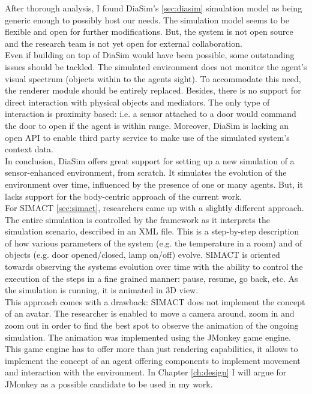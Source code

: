 After thorough analysis, I found DiaSim's \ref{sec:diasim} simulation model as being generic enough to possibly host our needs. The simulation model seems to be flexible and open for further modifications. But, the system is not open source and the research team is not yet open for external collaboration.\\

Even if building on top of DiaSim would have been possible, some outstanding issues should be tackled. The simulated environment does not monitor the agent's visual spectrum (objects within to the agents sight). To accommodate this need, the renderer module should be entirely replaced. Besides, there is no support for direct interaction with physical objects and mediators. The only type of interaction is proximity based: i.e. a sensor attached to a door would command the door to open if the agent is within range. Moreover, DiaSim is lacking an open API to enable third party service to make use of the simulated system's context data.\\

In conclusion, DiaSim offers great support for setting up a new simulation of a sensor-enhanced environment, from scratch. It simulates the evolution of the environment over time, influenced by the presence of one or many agents. But, it lacks support for the body-centric approach of the current work.\\

For SIMACT \ref{sec:simact}, researchers came up with a slightly different approach. The entire simulation is controlled by the framework as it interprets the simulation scenario, described in an XML file. This is a step-by-step description of how various parameters of the system (e.g. the temperature in a room) and of objects (e.g. door opened/closed, lamp on/off) evolve. SIMACT is oriented towards observing the systems evolution over time with the ability to control the execution of the steps in a fine grained manner: pause, resume, go back, etc. As the simulation is running, it is animated in 3D view.\\

This approach comes with a drawback: SIMACT does not implement the concept of an avatar. The researcher is enabled to move a camera around, zoom in and zoom out in order to find the best spot to observe the animation of the ongoing simulation. The animation was implemented using the JMonkey game engine. This game engine has to offer more than just rendering capabilities, it allows to implement the concept of an agent offering components to implement movement and interaction with the environment. In Chapter \ref{ch:design} I will argue for JMonkey as a possible candidate to be used in my work.\\

